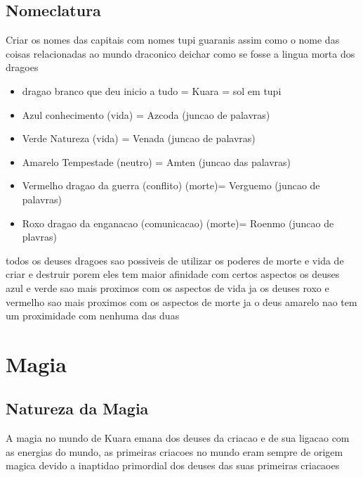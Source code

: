\documentclass{book}
\begin{document}
\chapter{Nomeclatura}
Criar os nomes das capitais com nomes tupi guaranis assim como o nome das coisas relacionadas 
ao mundo draconico deichar como se fosse a lingua morta dos dragoes 
\begin{itemize}
      \item  dragao branco que deu inicio a tudo = Kuara = sol em tupi
      \item  Azul conhecimento (vida) =  Azcoda (juncao de palavras)
      \item  Verde Natureza (vida) = Venada (juncao de palavras)
      \item  Amarelo Tempestade (neutro) = Amten (juncao das palavras)
      \item  Vermelho dragao da guerra (conflito) (morte)= Verguemo (juncao de palavras)
      \item  Roxo dragao da enganacao (comunicacao) (morte)= Roenmo (juncao de plavras)
\end{itemize}
todos os deuses dragoes sao possiveis de utilizar os poderes de morte e vida de criar e 
destruir porem eles tem maior afinidade com certos aspectos os deuses azul e verde sao mais 
proximos com os aspectos de vida ja os deuses roxo e vermelho sao mais proximos com os 
aspectos de morte ja o deus amarelo nao tem um proximidade com nenhuma das duas 



\part{Magia}
\chapter{Natureza da Magia}
A magia no mundo de Kuara emana dos deuses da criacao e de sua ligacao com as energias do 
mundo, as primeiras criacoes no mundo eram sempre de origem magica devido a inaptidao 
primordial dos deuses das suas primeiras criacaoes
\end{document}
